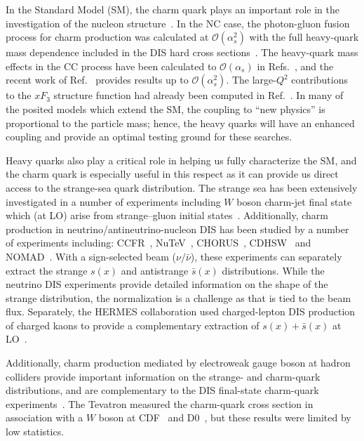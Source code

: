 \documentclass[pdftex,twocolumn,epjc3]{svjour3}          %
\begin{document}
In the Standard Model (SM), the charm quark plays an important role in
the investigation of the nucleon
structure~\cite{Behnke:2015qja,Zenaiev:2016kfl,Abdolmaleki:2017wlg}.
%
In the NC case, the photon-gluon fusion process for charm production
was calculated at ${\mathcal{O}}(\alpha_s^2)$ with the full
heavy-quark mass dependence included in the DIS hard cross
sections~\cite{Laenen:1992zk,Laenen:1992xs}.
%
The heavy-quark mass effects in the CC process have been calculated to
${\mathcal{O}}(\alpha_s)$ in
Refs.~\cite{Gottschalk:1980rv,Gluck:1997sj,Blumlein:2011zu,Buza:1997mg,Blumlein:2014fqa},
and the recent work of Ref.~\cite{Berger:2016inr} provides results up
to ${\mathcal{O}}(\alpha_s^2)$. The large-$Q^2$ contributions to the
$xF_3$ structure function had already been computed in
Ref.~\cite{Behring:2015roa}.
%
In many of the posited models which extend the SM, the coupling to
``new physics'' is proportional to the particle mass; hence, the heavy
quarks will have an enhanced coupling and provide an optimal testing
ground for these searches.

Heavy quarks also play a critical role in helping us fully
characterize the SM, and the charm quark is especially useful in this
respect as it can provide us direct access to the strange-sea quark
distribution.
%
The strange sea has been extensively investigated in a number of
experiments including $W$ boson charm-jet final state which (at LO)
arise from strange--gluon initial states~\cite{Aaltonen:2007dm,Abazov:2008qz,Abazov:2014fka,Chatrchyan:2013uja,Aad:2014xca,Sirunyan:2018hde}.
%
Additionally, charm production in neutrino/antineutrino-nucleon DIS
has been studied by a number of experiments including:
%
CCFR~\cite{Seligman:1997mc},
NuTeV~\cite{Tzanov:2005kr},
CHORUS~\cite{Onengut:2005kv},
CDHSW~\cite{Berge:1989hr}
and
NOMAD~\cite{Samoylov:2013xoa}.
%
With a sign-selected beam ($\nu/\bar{\nu}$), these experiments can
separately extract the strange $s(x)$ and antistrange $\bar{s}(x)$
distributions. While the neutrino DIS experiments provide
detailed information on the shape of the strange distribution, the
normalization is a challenge as that is tied to the beam flux.
%
Separately, the HERMES collaboration used charged-lepton DIS
production of charged kaons to provide a complementary extraction of
$s(x)+ \bar{s}(x)$ at LO~\cite{Airapetian:2008qf}.

Additionally, charm production mediated by electroweak gauge boson at
hadron colliders provide important information on the strange- and
charm-quark distributions, and are complementary to the DIS final-state
charm-quark experiments~\cite{Lai:2007dq}.
%
The Tevatron measured the charm-quark cross section in association
with a $W$ boson at CDF~\cite{Aaltonen:2007dm} and
D0~\cite{Abazov:2008qz}, but these results were limited by low
statistics.
\end{document}
